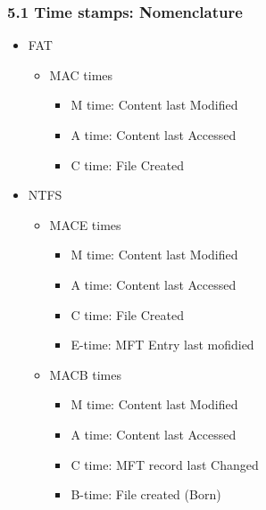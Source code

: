 \begin{frame}[fragile]
\frametitle{5.1 Time stamps: Nomenclature}
    \begin{itemize}
        \item FAT
        \begin{itemize}
            \item MAC times
            \begin{itemize}
                \item M time: Content last Modified
                \item A time: Content last Accessed
                \item C time: File Created
            \end{itemize}
        \end{itemize}
        \item NTFS
        \begin{itemize}
            \item MACE times
            \begin{itemize}
                \item M time: Content last Modified
                \item A time: Content last Accessed
                \item C time: File Created
                \item E-time: MFT Entry last mofidied
            \end{itemize}
            \item MACB times
            \begin{itemize}
                \item M time: Content last Modified
                \item A time: Content last Accessed
                \item C time: MFT record last Changed
		\item B-time: File created (Born)
            \end{itemize}
        \end{itemize}
    \end{itemize}
\end{frame}


